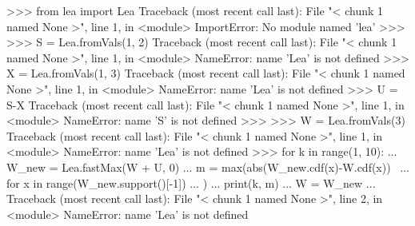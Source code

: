 
>>> from lea import Lea
Traceback (most recent call last):
  File "< chunk 1 named None >", line 1, in <module>
ImportError: No module named 'lea'
>>> 
>>> S = Lea.fromVals(1,  2)
Traceback (most recent call last):
  File "< chunk 1 named None >", line 1, in <module>
NameError: name 'Lea' is not defined
>>> X = Lea.fromVals(1,  3)
Traceback (most recent call last):
  File "< chunk 1 named None >", line 1, in <module>
NameError: name 'Lea' is not defined
>>> U = S-X
Traceback (most recent call last):
  File "< chunk 1 named None >", line 1, in <module>
NameError: name 'S' is not defined
>>> 
>>> W = Lea.fromVals(3)
Traceback (most recent call last):
  File "< chunk 1 named None >", line 1, in <module>
NameError: name 'Lea' is not defined
>>> for k in range(1, 10):
...     W_new = Lea.fastMax(W + U, 0)
...     m = max(abs(W_new.cdf(x)-W.cdf(x)) \
...             for x in range(W_new.support()[-1])
...             )
...     print(k, m) 
...     W = W_new
... 
Traceback (most recent call last):
  File "< chunk 1 named None >", line 2, in <module>
NameError: name 'Lea' is not defined
